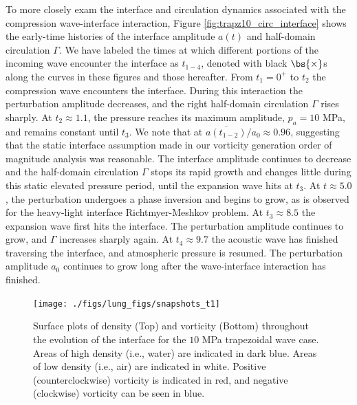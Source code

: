 To more closely exam the interface and circulation dynamics associated
with the compression wave-interface interaction, Figure
\ref{fig:trapz10_circ_interface} shows the early-time histories of the
interface amplitude $a(t)$ and half-domain circulation $\Gamma$. We
have labeled the times at which different portions of the incoming
wave encounter the interface as $t_{1-4}$, denoted with black
$\bs{\times}$s along the curves in these figures and those
hereafter. From $t_1=0^+$ to $t_2$ the compression wave encounters the
interface. During this interaction the perturbation amplitude
decreases, and the right half-domain circulation $\Gamma$ rises
sharply. At $t_2\approx1.1$, the pressure reaches its maximum
amplitude, $p_a=10$ MPa, and remains constant until $t_3$. We note
that at $\overline{a(t_{1-2})}/a_0\approx0.96$, suggesting that the
static interface assumption made in our vorticity generation order of
magnitude analysis was reasonable. The interface amplitude continues
to decrease and the half-domain circulation $\Gamma$ stops its rapid
growth and changes little during this static elevated pressure period,
until the expansion wave hits at $t_3$. At $t\approx 5.0$, the
perturbation undergoes a phase inversion and begins to grow, as is
observed for the heavy-light interface Richtmyer-Meshkov problem. At
$t_3\approx8.5$ the expansion wave first hits the interface. The
perturbation amplitude continues to grow, and $\Gamma$ increases
sharply again. At $t_4\approx9.7$ the acoustic wave has finished
traversing the interface, and atmospheric pressure is resumed. The
perturbation amplitude $a_0$ continues to grow long after the
wave-interface interaction has finished.
%
\begin{figure}[h] 
  \centering
\texttt{[image: ./figs/lung\_figs/snapshots\_t1]}
\caption[The evolution of the acoustically perturbed interface and vorticity field]{Surface plots of density (Top) and vorticity (Bottom)
  throughout the evolution of the interface for the $10$ MPa
  trapezoidal wave case. Areas of high density (i.e., water) are
indicated in dark blue. Areas of low density (i.e., air) are indicated
in white.  Positive (counterclockwise) vorticity is indicated in red,
and negative (clockwise) vorticity can be seen in blue.}
  \label{fig:interface_snapshots}
\end{figure}
%
